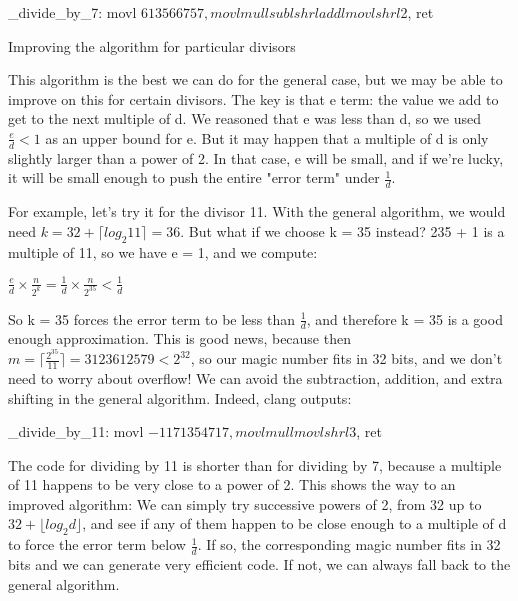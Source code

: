 _divide_by_7:
 movl $613566757, %
 movl %
 mull %
 subl %
 shrl %
 addl %
 movl %
 shrl $2, %
 ret

 
Improving the algorithm for particular divisors

This algorithm is the best we can do for the general case, but we may be able to improve on this for certain divisors. The key is that e term: the value we add to get to the next multiple of d. We reasoned that e was less than d, so we used $\frac e d < 1$ as an upper bound for e. But it may happen that a multiple of d is only slightly larger than a power of 2. In that case, e will be small, and if we're lucky, it will be small enough to push the entire "error term" under $\frac 1 d$.

For example, let's try it for the divisor 11. With the general algorithm, we would need $k = 32 + \lceil log_2 11 \rceil = 36$. But what if we choose k = 35 instead? 235 + 1 is a multiple of 11, so we have e = 1, and we compute:

$\frac e d \times \frac n {2^k} = \frac 1 d \times \frac n {2^{35}} < \frac 1 d$

So k = 35 forces the error term to be less than $\frac 1 d$, and therefore k = 35 is a good enough approximation. This is good news, because then $m = \lceil \frac {2^{35}} {11} \rceil = 3123612579 < 2^{32}$, so our magic number fits in 32 bits, and we don't need to worry about overflow! We can avoid the subtraction, addition, and extra shifting in the general algorithm. Indeed, clang outputs:

_divide_by_11:
  movl  $-1171354717, %
  movl  %
  mull  %
  movl  %
  shrl  $3, %
  ret

The code for dividing by 11 is shorter than for dividing by 7, because a multiple of 11 happens to be very close to a power of 2. This shows the way to an improved algorithm: We can simply try successive powers of 2, from 32 up to $32 + \lfloor log_2 d \rfloor$, and see if any of them happen to be close enough to a multiple of d to force the error term below $\frac 1 d$. If so, the corresponding magic number fits in 32 bits and we can generate very efficient code. If not, we can always fall back to the general algorithm.

